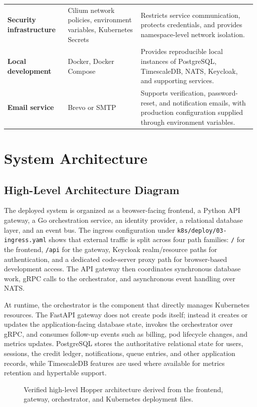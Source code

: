 \documentclass[12pt,a4paper]{article}
\begin{document}
\begin{table}[!htbp]
\begin{tabularx}{\textwidth}{
    >{\raggedright\arraybackslash\bfseries}p{}
    >{\raggedright\arraybackslash}p{}
    >{\raggedright\arraybackslash}X
}
Security infrastructure &
Cilium network policies, environment variables, Kubernetes Secrets &
Restricts service communication, protects credentials, and provides namespace-level network isolation. \\

Local development &
Docker, Docker Compose &
Provides reproducible local instances of PostgreSQL, TimescaleDB, NATS, Keycloak, and supporting services. \\

Email service &
Brevo or SMTP &
Supports verification, password-reset, and notification emails, with production configuration supplied through environment variables. \\

\bottomrule
\end{tabularx}
\normalsize
\end{table}
\section{System Architecture}
\subsection{High-Level Architecture Diagram}
The deployed system is organized as a browser-facing frontend, a Python API gateway, a Go orchestration service, an identity provider, a relational database layer, and an event bus. The ingress configuration under \texttt{k8s/deploy/03-ingress.yaml} shows that external traffic is split across four path families: \texttt{/} for the frontend, \texttt{/api} for the gateway, Keycloak realm/resource paths for authentication, and a dedicated code-server proxy path for browser-based development access. The API gateway then coordinates synchronous database work, gRPC calls to the orchestrator, and asynchronous event handling over NATS.

At runtime, the orchestrator is the component that directly manages Kubernetes resources. The FastAPI gateway does not create pods itself; instead it creates or updates the application-facing database state, invokes the orchestrator over gRPC, and consumes follow-up events such as billing, pod lifecycle changes, and metrics updates. PostgreSQL stores the authoritative relational state for users, sessions, the credit ledger, notifications, queue entries, and other application records, while TimescaleDB features are used where available for metrics retention and hypertable support.

\begin{figure}[H]
    \centering
    
    \caption{Verified high-level Hopper architecture derived from the frontend, gateway, orchestrator, and Kubernetes deployment files.}
    \label{fig:hopper-high-level-architecture}
\end{figure}
\end{document}
